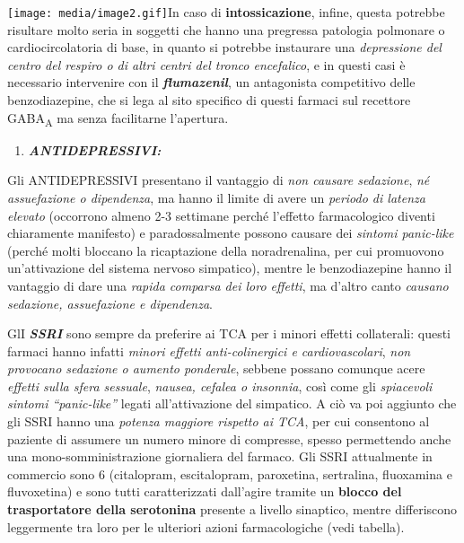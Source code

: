 \documentclass[]{article}
\begin{document}
\texttt{[image: media/image2.gif]}In
caso di \textbf{intossicazione}, infine, questa potrebbe risultare molto
seria in soggetti che hanno una pregressa patologia polmonare o
cardiocircolatoria di base, in quanto si potrebbe instaurare una
\emph{depressione del centro del respiro o di altri centri del tronco
encefalico}, e in questi casi è necessario intervenire con il
\textbf{\emph{flumazenil}}, un antagonista competitivo delle
benzodiazepine, che si lega al sito specifico di questi farmaci sul
recettore GABA\textsubscript{A} ma senza facilitarne l'apertura.

\begin{enumerate}
\def\labelenumi{\arabic{enumi}.}
\item
  \textbf{\emph{ANTIDEPRESSIVI:}}
\end{enumerate}

Gli ANTIDEPRESSIVI presentano il vantaggio di \emph{non causare
sedazione}, \emph{né assuefazione o dipendenza}, ma hanno il limite di
avere un \emph{periodo di latenza elevato} (occorrono almeno 2-3
settimane perché l'effetto farmacologico diventi chiaramente manifesto)
e paradossalmente possono causare dei \emph{sintomi panic-like} (perché
molti bloccano la ricaptazione della noradrenalina, per cui promuovono
un'attivazione del sistema nervoso simpatico), mentre le benzodiazepine
hanno il vantaggio di dare una \emph{rapida comparsa dei loro effetti},
ma d'altro canto \emph{causano sedazione, assuefazione e dipendenza}.

GlI \emph{\textbf{SSRI}} sono sempre da preferire ai TCA per i minori
effetti collaterali: questi farmaci hanno infatti \emph{minori effetti
anti-colinergici e cardiovascolari}, \emph{non provocano sedazione o
aumento ponderale}, sebbene possano comunque acere \emph{effetti sulla
sfera sessuale}, \emph{nausea, cefalea o insonnia}, così come gli
\emph{spiacevoli sintomi ``panic-like''} legati all'attivazione del
simpatico. A ciò va poi aggiunto che gli SSRI hanno una \emph{potenza
maggiore rispetto ai TCA}, per cui consentono al paziente di assumere un
numero minore di compresse, spesso permettendo anche una
mono-somministrazione giornaliera del farmaco. Gli SSRI attualmente in
commercio sono 6 (citalopram, escitalopram, paroxetina, sertralina,
fluoxamina e fluvoxetina) e sono tutti caratterizzati dall'agire tramite
un \textbf{blocco del trasportatore della serotonina} presente a livello
sinaptico, mentre differiscono leggermente tra loro per le ulteriori
azioni farmacologiche (vedi tabella).
\end{document}

